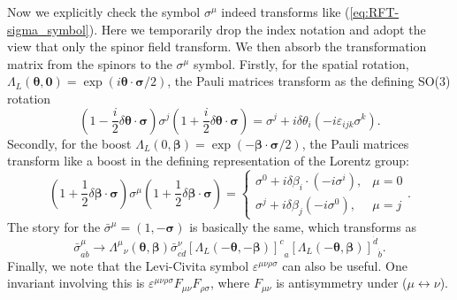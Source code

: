 \documentclass[aps,prb,superscriptaddress,nofootinbib]{revtex4}
\begin{document}
Now we explicitly check the symbol $\sigma^\mu$ indeed transforms like (\ref{eq:RFT-sigma_symbol}).
Here we temporarily drop the index notation and adopt the view that only the spinor field transform.
We then absorb the transformation matrix from the spinors to the $\sigma^\mu$ symbol.
Firstly, for the spatial rotation, $\Lambda_L(\bm\theta,\bm 0) = \exp(i\bm\theta\cdot \bm\sigma/2)$, the Pauli matrices transform as the defining SO(3) rotation
\begin{equation}
	\left(1-\frac{i}{2}\delta\bm\theta\cdot \bm\sigma \right)\sigma^j\left(1+\frac{i}{2}\delta\bm\theta\cdot \bm\sigma\right)
	= \sigma^j + i\delta\theta_i \left(-i \varepsilon_{ijk}\sigma^k \right).
\end{equation}
Secondly, for the boost $\Lambda_{L}(0, \bm\beta) = \exp\left(-\bm\beta\cdot \bm\sigma /2 \right)$, the Pauli matrices transform like a boost in the defining representation of the Lorentz group:
\begin{equation}
	\left(1+\frac{1}{2}\delta\bm\beta\cdot \bm\sigma\right) \sigma^\mu 
	\left(1+\frac{1}{2}\delta\bm\beta\cdot \bm\sigma\right) = \begin{cases}
		 \sigma^0 + i\delta\beta_i \cdot (-i\sigma^i), & \mu = 0 \\
		 \sigma^j + i\delta\beta_j (-i\sigma^0), & \mu = j
	\end{cases}.
\end{equation}
The story for the $\bar\sigma^\mu=(1,-\bm\sigma)$ is basically the same, which transforms as
\begin{equation}
	\bar\sigma^\mu_{a \dot b} \rightarrow
	{\Lambda^\mu}_\nu(\bm\theta,\bm\beta) \bar\sigma^\nu_{c \dot d}
	{\left[\Lambda_L(-\bm\theta, -\bm\beta)\right]^{c}}_{a} {\left[\Lambda_L(-\bm\theta, \bm\beta)\right]^{\dot d}}_{\dot b}.
\end{equation}
Finally, we note that the Levi-Civita symbol $\varepsilon^{\mu\nu\rho\sigma}$ can also be useful.
One invariant involving this is $\varepsilon^{\mu\nu\rho\sigma} F_{\mu\nu} F_{\rho\sigma}$, where $F_{\mu\nu}$ is antisymmetry under ($\mu \leftrightarrow \nu$).
\end{document}
